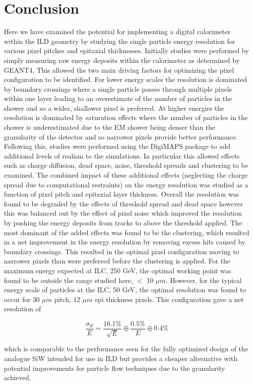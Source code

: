 \section{Conclusion}

Here we have examined the potential for implementing a digital calorimeter within the \ac{ILD} geometry by studying the single particle energy resolution for various pixel pitches and epitaxial thicknesses. Initially studies were performed by simply measuring raw energy deposits within the calorimeter as determined by GEANT4. This allowed the two main driving factors for optimizing the pixel configuration to be identified. For lower energy scales the resolution is dominated by boundary crossings where a single particle passes through multiple pixels within one layer leading to an overestimate of the number of particles in the shower and so a wider, shallower pixel is preferred. At higher energies the resolution is dominated by saturation effects where the number of particles in the shower is underestimated due to the EM shower being denser than the granularity of the detector and so narrower pixels provide better performance. Following this, studies were performed using the DigiMAPS package to add additional levels of realism to the simulations. In particular this allowed effects such as charge diffusion, dead space, noise, threshold spreads and clustering to be examined. The combined impact of these additional effects (neglecting the charge spread due to computational restraints) on the energy resolution was studied as a function of pixel pitch and epitaxial layer thickness. Overall the resolution was found to be degraded by the effects of threshold spread and dead space however this was balanced out by the effect of pixel noise which improved the resolution by pushing the energy deposits from tracks to above the threshold applied. The most dominant of the added effects was found to be the clustering, which resulted in a net improvement in the energy resolution by removing excess hits caused by boundary crossings. This resulted in the optimal pixel configuration moving to narrower pixels than were preferred before the clustering is applied. For the maximum energy expected at \ac{ILC}, 250 GeV, the optimal working point was found to be outside the range studied here, $<$ 10 $\mu m$. However, for the typical energy scale of particles at the \ac{ILC}, 50 GeV, the optimal resolution was found to occur for 30 $\mu m$ pitch, 12 $\mu m$ epi thickness pixels. This configuration gave a net resolution of

\begin{equation}
  \frac{\sigma_E}{E}=\frac{16.1\%}{\sqrt{E}} \oplus \frac{0.5\%}{E} \oplus 0.4\%
\end{equation}

which is comparable to the performance seen for the fully optimized design of the analogue SiW intended for use in \ac{ILD} but provides a cheaper alternative with potential improvements for particle flow techniques due to the granularity achieved. 
